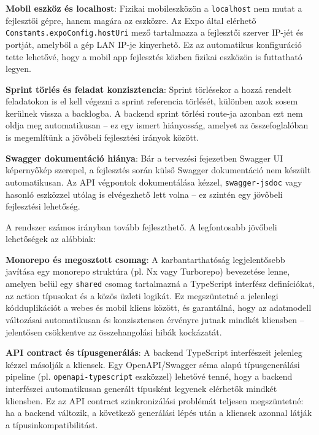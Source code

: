 \textbf{Mobil eszköz és localhost}: Fizikai mobileszközön a \texttt{localhost} nem mutat a fejlesztői gépre, hanem magára az eszközre. Az Expo által elérhető \texttt{Constants.\allowbreak{}expoConfig.\allowbreak{}hostUri} mező tartalmazza a fejlesztői szerver IP-jét és portját, amelyből a gép LAN IP-je kinyerhető. Ez az automatikus konfiguráció tette lehetővé, hogy a mobil app fejlesztés közben fizikai eszközön is futtatható legyen.

\textbf{Sprint törlés és feladat konzisztencia}: Sprint törlésekor a hozzá rendelt feladatokon is el kell végezni a sprint referencia törlését, különben azok sosem kerülnek vissza a backlogba. A backend sprint törlési route-ja azonban ezt nem oldja meg automatikusan – ez egy ismert hiányosság, amelyet az összefoglalóban is megemlítünk a jövőbeli fejlesztési irányok között.

\textbf{Swagger dokumentáció hiánya}: Bár a tervezési fejezetben Swagger UI képernyőkép szerepel, a fejlesztés során külső Swagger dokumentáció nem készült automatikusan. Az API végpontok dokumentálása kézzel, \texttt{swagger-jsdoc} vagy hasonló eszközzel utólag is elvégezhető lett volna – ez szintén egy jövőbeli fejlesztési lehetőség.



A rendszer számos irányban tovább fejleszthető. A legfontosabb jövőbeli lehetőségek az alábbiak:

\textbf{Monorepo és megosztott csomag}: A karbantarthatóság legjelentősebb javítása egy monorepo struktúra (pl. Nx vagy Turborepo) bevezetése lenne, amelyen belül egy \texttt{shared} csomag tartalmazná a TypeScript interfész definíciókat, az action típusokat és a közös üzleti logikát. Ez megszüntetné a jelenlegi kódduplikációt a webes és mobil kliens között, és garantálná, hogy az adatmodell változásai automatikusan és konzisztensen érvényre jutnak mindkét kliensben -- jelentősen csökkentve az összehangolási hibák kockázatát.

\textbf{API contract és típusgenerálás}: A backend TypeScript interfészeit jelenleg kézzel másolják a kliensek. Egy OpenAPI/Swagger séma alapú típusgenerálási pipeline (pl. \texttt{openapi-typescript} eszközzel) lehetővé tenné, hogy a backend interfészei automatikusan generált típusként legyenek elérhetők mindkét kliensben. Ez az API contract szinkronizálási problémát teljesen megszüntetné: ha a backend változik, a következő generálási lépés után a kliensek azonnal látják a típusinkompatibilitást.

